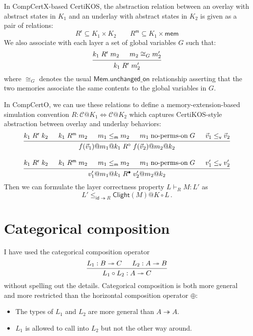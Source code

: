 \documentclass{article}
\begin{document}
In CompCertX-based CertiKOS,
the abstraction relation between
an overlay with abstract states in $K_1$ and
an underlay with abstract states in $K_2$
is given as a pair of relations:
\[
  R^\mathsf{r} \subseteq K_1 \times K_2
  \qquad
  R^\mathsf{m} \subseteq K_1 \times \mathsf{mem}
\]
We also associate with each layer a set of global variables $G$
such that:
\[
  \begin{prooftree}
    \hypo{k_1 \mathrel{R^\mathsf{r}} m_2}
    \hypo{m_2 \cong_G m_2'}
    \infer2{k_1 \mathrel{R^\mathsf{r}} m_2'}
  \end{prooftree}
\]
where $\cong_G$ denotes the usual $\mathsf{Mem.unchanged\_on}$
relationship asserting that the two memories
associate the same contents to the global variables in $G$.

In CompCertO,
we can use these relations to define a
memory-extension-based simulation convention
$R : \mathcal{C}@K_1 \Leftrightarrow \mathcal{C}@K_2$
which captures CertiKOS-style abstraction between
overlay and underlay behaviors:
\begin{gather*}
 {\begin{prooftree}
    \hypo{k_1 \mathrel{R^\mathsf{r}} k_2}
    \hypo{k_1 \mathrel{R^\mathsf{m}} m_2}
    \hypo{m_1 \le_\mathsf{m} m_2}
    \hypo{m_1 \mathrel\text{no-perms-on} G}
    \hypo{\vec{v}_1 \le_\mathsf{v} \vec{v}_2}
    \infer5{f(\vec{v}_1)@m_1@k_1 \mathrel{R^\circ} f(\vec{v}_2)@m_2@k_2}
  \end{prooftree}}
\\[1em]
 {\begin{prooftree}
    \hypo{k_1 \mathrel{R^\mathsf{r}} k_2}
    \hypo{k_1 \mathrel{R^\mathsf{m}} m_2}
    \hypo{m_1 \le_\mathsf{m} m_2}
    \hypo{m_1 \mathrel\text{no-perms-on} G}
    \hypo{v'_1 \le_\mathsf{v} v'_2}
    \infer5{v'_1@m_1@k_1 \mathrel{R^\bullet} v'_2@m_2@k_2}
  \end{prooftree}}
\end{gather*}
Then we can
formulate the layer correctness property
$L \vdash_R M : L'$ as
\[
    L' \le_{\mathsf{id} \twoheadrightarrow R}
    \mathsf{Clight}(M)@K \circ L
    \,.
\]



\section{Categorical composition} %

I have used the categorical composition operator
\[
  \begin{prooftree}
    \hypo{L_1 : B \twoheadrightarrow C}
    \hypo{L_2 : A \twoheadrightarrow B}
    \infer2{L_1 \circ L_2 : A \twoheadrightarrow C}
  \end{prooftree}
\]
without spelling out the details.
Categorical composition is both
more general and more restricted
than the horizontal composition operator $\oplus$:
\begin{itemize}
  \item The types of $L_1$ and $L_2$
    are more general than $A \twoheadrightarrow A$.
  \item 
    $L_1$ is allowed to call into $L_2$
    but not the other way around.
\end{itemize}
\end{document}
